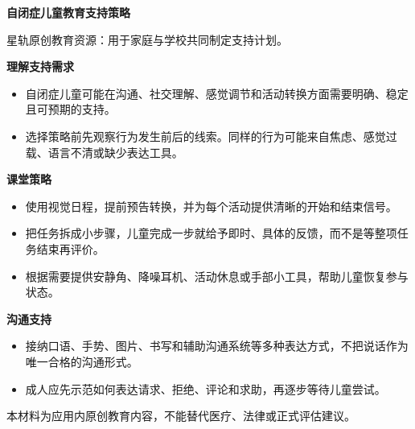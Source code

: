 \documentclass[11pt]{article}
\begin{document}
{\color[HTML]{1F5FD2}\LARGE\bfseries 自闭症儿童教育支持策略\par}
{\color[HTML]{667085}\small 星轨原创教育资源：用于家庭与学校共同制定支持计划。\par}
\vspace{0.8em}
{\color[HTML]{111827}\large\bfseries 理解支持需求\par}
\begin{itemize}
\item 自闭症儿童可能在沟通、社交理解、感觉调节和活动转换方面需要明确、稳定且可预期的支持。
\item 选择策略前先观察行为发生前后的线索。同样的行为可能来自焦虑、感觉过载、语言不清或缺少表达工具。
\end{itemize}
{\color[HTML]{111827}\large\bfseries 课堂策略\par}
\begin{itemize}
\item 使用视觉日程，提前预告转换，并为每个活动提供清晰的开始和结束信号。
\item 把任务拆成小步骤，儿童完成一步就给予即时、具体的反馈，而不是等整项任务结束再评价。
\item 根据需要提供安静角、降噪耳机、活动休息或手部小工具，帮助儿童恢复参与状态。
\end{itemize}
{\color[HTML]{111827}\large\bfseries 沟通支持\par}
\begin{itemize}
\item 接纳口语、手势、图片、书写和辅助沟通系统等多种表达方式，不把说话作为唯一合格的沟通形式。
\item 成人应先示范如何表达请求、拒绝、评论和求助，再逐步等待儿童尝试。
\end{itemize}
\vfill
{\color[HTML]{667085}\footnotesize 本材料为应用内原创教育内容，不能替代医疗、法律或正式评估建议。\par}
\end{document}
